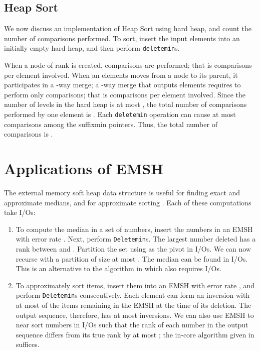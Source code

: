\subsection{Heap Sort}
We now discuss an implementation of Heap Sort using hard heap, and
count the number of comparisons performed.
To sort, insert the  input elements into an initially empty hard heap, and 
then perform  {\tt deletemin}s.

When a node of rank  is created,  comparisons are performed;
that is  comparisons per element involved.
When an elements moves from a node to its parent, it participates in a -way merge;
	a -way merge that outputs  elements requires to perform only
	 comparisons; that is  comparisons per element involved.
Since the number of levels in the hard heap is at most , the total
	number of comparisons performed by one element is .
Each {\tt deletemin} operation can cause at most  comparisons
	among the suffixmin pointers.
Thus, the total number of comparisons is . 
\section{Applications of EMSH}
\label{appl:emsh} 
The external memory soft heap data structure is useful for finding exact and 
	approximate medians, and for approximate sorting \cite{Ch00a}.
Each of these computations take  I/Os:
\begin{enumerate}
\item To compute the median in a set of  numbers, insert the numbers
        in an EMSH with error rate .
Next, perform  {\tt Deletemin}s. The largest number  deleted
        has a rank between  and .
Partition the set using  as the pivot in  I/Os.
We can now recurse with a partition of size at most .
The median can be found in  I/Os.
This is an alternative to the algorithm in \cite{Si02} which also requires  I/Os.
\item To approximately sort  items, insert them into an EMSH with error rate , and
        perform  {\tt Deletemin}s consecutively. Each element can form an inversion with
        at most  of the items remaining in the EMSH at the time of its deletion.
        The output sequence, therefore, has at most  inversions.
We can also use EMSH to near sort  numbers in  I/Os such that
        the rank of each number in the output sequence differs from
        its true rank by at most ; the in-core algorithm given in \cite{Ch00a} suffices.
\end{enumerate}

